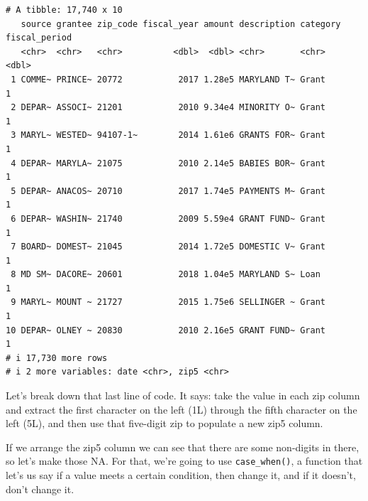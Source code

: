 \documentclass[
  letterpaper,
  DIV=11,
  numbers=noendperiod]{scrreprt}
\begin{document}
\begin{verbatim}
# A tibble: 17,740 x 10
   source grantee zip_code fiscal_year amount description category fiscal_period
   <chr>  <chr>   <chr>          <dbl>  <dbl> <chr>       <chr>            <dbl>
 1 COMME~ PRINCE~ 20772           2017 1.28e5 MARYLAND T~ Grant                1
 2 DEPAR~ ASSOCI~ 21201           2010 9.34e4 MINORITY O~ Grant                1
 3 MARYL~ WESTED~ 94107-1~        2014 1.61e6 GRANTS FOR~ Grant                1
 4 DEPAR~ MARYLA~ 21075           2010 2.14e5 BABIES BOR~ Grant                1
 5 DEPAR~ ANACOS~ 20710           2017 1.74e5 PAYMENTS M~ Grant                1
 6 DEPAR~ WASHIN~ 21740           2009 5.59e4 GRANT FUND~ Grant                1
 7 BOARD~ DOMEST~ 21045           2014 1.72e5 DOMESTIC V~ Grant                1
 8 MD SM~ DACORE~ 20601           2018 1.04e5 MARYLAND S~ Loan                 1
 9 MARYL~ MOUNT ~ 21727           2015 1.75e6 SELLINGER ~ Grant                1
10 DEPAR~ OLNEY ~ 20830           2010 2.16e5 GRANT FUND~ Grant                1
# i 17,730 more rows
# i 2 more variables: date <chr>, zip5 <chr>
\end{verbatim}

Let's break down that last line of code. It says: take the value in each
zip column and extract the first character on the left (1L) through the
fifth character on the left (5L), and then use that five-digit zip to
populate a new zip5 column.

If we arrange the zip5 column we can see that there are some non-digits
in there, so let's make those NA. For that, we're going to use
\texttt{case\_when()}, a function that let's us say if a value meets a
certain condition, then change it, and if it doesn't, don't change it.
\end{document}
